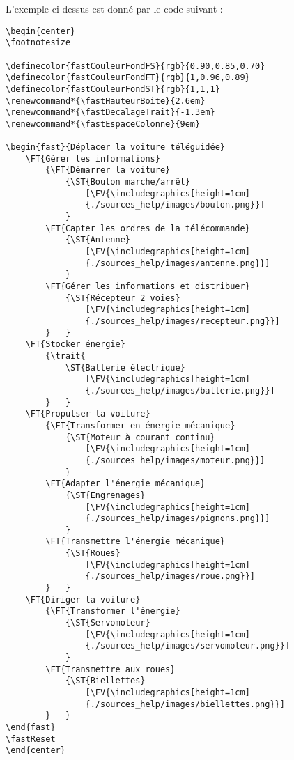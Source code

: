 	L'exemple ci-dessus est donné par le code suivant :

\begin{lstlisting}
\begin{center}
\footnotesize

\definecolor{fastCouleurFondFS}{rgb}{0.90,0.85,0.70}
\definecolor{fastCouleurFondFT}{rgb}{1,0.96,0.89}
\definecolor{fastCouleurFondST}{rgb}{1,1,1}
\renewcommand*{\fastHauteurBoite}{2.6em}
\renewcommand*{\fastDecalageTrait}{-1.3em}
\renewcommand*{\fastEspaceColonne}{9em}

\begin{fast}{Déplacer la voiture téléguidée}
	\FT{Gérer les informations}
		{\FT{Démarrer la voiture}
			{\ST{Bouton marche/arrêt}
				[\FV{\includegraphics[height=1cm]
				{./sources_help/images/bouton.png}}]
			}
		\FT{Capter les ordres de la télécommande}
			{\ST{Antenne}
				[\FV{\includegraphics[height=1cm]
				{./sources_help/images/antenne.png}}]
			}
		\FT{Gérer les informations et distribuer}
			{\ST{Récepteur 2 voies}
				[\FV{\includegraphics[height=1cm]
				{./sources_help/images/recepteur.png}}]
		}	}
	\FT{Stocker énergie}
		{\trait{
			\ST{Batterie électrique}
				[\FV{\includegraphics[height=1cm]
				{./sources_help/images/batterie.png}}]
		}	}
	\FT{Propulser la voiture}
		{\FT{Transformer en énergie mécanique}
			{\ST{Moteur à courant continu}
				[\FV{\includegraphics[height=1cm]
				{./sources_help/images/moteur.png}}]
			}
		\FT{Adapter l'énergie mécanique}
			{\ST{Engrenages}
				[\FV{\includegraphics[height=1cm]
				{./sources_help/images/pignons.png}}]
			}
		\FT{Transmettre l'énergie mécanique}
			{\ST{Roues}
				[\FV{\includegraphics[height=1cm]
				{./sources_help/images/roue.png}}]
		}	}
	\FT{Diriger la voiture}
		{\FT{Transformer l'énergie}
			{\ST{Servomoteur}
				[\FV{\includegraphics[height=1cm]
				{./sources_help/images/servomoteur.png}}]
			}
		\FT{Transmettre aux roues}
			{\ST{Biellettes}
				[\FV{\includegraphics[height=1cm]
				{./sources_help/images/biellettes.png}}]
		}	}
\end{fast}
\fastReset
\end{center}
\end{lstlisting}
	
